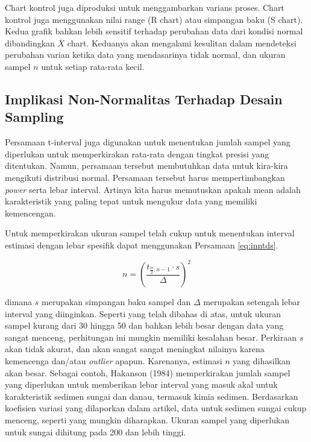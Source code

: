 \documentclass[]{book}
\begin{document}
Chart kontrol juga diproduksi untuk menggambarkan varians proses. Chart
kontrol juga menggunakan nilai range (R chart) atau simpangan baku (S
chart). Kedua grafik bahkan lebih sensitif terhadap perubahan data dari
kondisi normal dibandingkan \(\overline{X}\) chart. Keduanya akan
mengalami kesulitan dalam mendeteksi perubahan varian ketika data yang
mendasarinya tidak normal, dan ukuran sampel \(n\) untuk setiap
rata-rata kecil.

\subsection{Implikasi Non-Normalitas Terhadap Desain
Sampling}\label{implikasi-non-normalitas-terhadap-desain-sampling}

Persamaan t-interval juga digunakan untuk menentukan jumlah sampel yang
diperlukan untuk memperkirakan rata-rata dengan tingkat presisi yang
ditentukan. Namun, persamaan tersebut membutuhkan data untuk kira-kira
mengikuti distribusi normal. Persamaan tersebut harus mempertimbangkan
\emph{power} serta lebar interval. Artinya kita harus memutuskan apakah
mean adalah karakteristik yang paling tepat untuk mengukur data yang
memiliki kemencengan.

Untuk memperkirakan ukuran sampel telah cukup untuk menentukan interval
estimasi dengan lebar spesifik dapat menggunakan Persamaan
\eqref{eq:inntds}.

\begin{equation}
  n=\left(\frac{t_{\frac{\alpha}{2},n-1}\cdot s}{\Delta}\right)^2
  \label{eq:inntds}
\end{equation}

dimana \(s\) merupakan simpangan baku sampel dan \(\Delta\) merupakan
setengah lebar interval yang diinginkan. Seperti yang telah dibahas di
atas, untuk ukuran sampel kurang dari 30 hingga 50 dan bahkan lebih
besar dengan data yang sangat menceng, perhitungan ini mungkin memiliki
kesalahan besar. Perkiraan \(s\) akan tidak akurat, dan akan sangat
sangat meningkat nilainya karena kemencenga dan/atau \emph{outlier}
apapun. Karenanya, estimasi \(n\) yang dihasilkan akan besar. Sebagai
contoh, Hakanson (1984) memperkirakan jumlah sampel yang diperlukan
untuk memberikan lebar interval yang masuk akal untuk karakteristik
sedimen sungai dan danau, termasuk kimia sedimen. Berdasarkan koefisien
variasi yang dilaporkan dalam artikel, data untuk sedimen sungai cukup
menceng, seperti yang mungkin diharapkan. Ukuran sampel yang diperlukan
untuk sungai dihitung pada 200 dan lebih tinggi.
\end{document}
